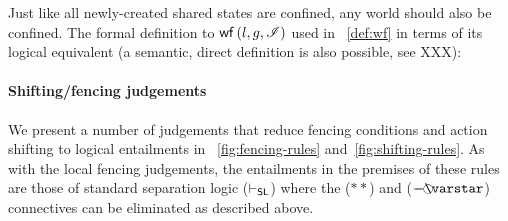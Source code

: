 Just like all newly-created shared states are confined, any world
should also be confined. The formal definition to
$\mathsf{wf}\left( l,g,\mathscr{I} \right)$ used in ~\ref{def:wf} in terms of its logical
equivalent (a semantic, direct definition is also possible, see XXX):


\paragraph{\textbf{Shifting/fencing judgements}}We present a number of judgements that reduce fencing conditions and action shifting to logical entailments in \fig~\ref{fig:fencing-rules} and~\ref{fig:shifting-rules}. As with the local fencing judgements, the entailments in the premises of these rules are those of standard separation logic ($\vdash_{\textsf{SL}}$) where the ($**$) and ($\septraction$) connectives can be eliminated as described above. 


